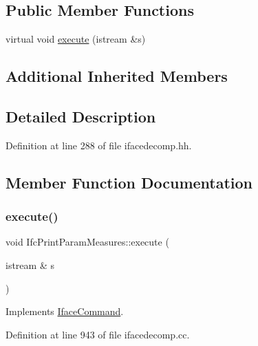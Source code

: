 \subsection*{Public Member Functions}
\begin{DoxyCompactItemize}
\item 
virtual void \mbox{\hyperlink{class_ifc_print_param_measures_a85f768a0cc5ac73b3feb42d46089ebce}{execute}} (istream \&s)
\end{DoxyCompactItemize}
\subsection*{Additional Inherited Members}


\subsection{Detailed Description}


Definition at line 288 of file ifacedecomp.\+hh.



\subsection{Member Function Documentation}
\mbox{\label{class_ifc_print_param_measures_a85f768a0cc5ac73b3feb42d46089ebce}} 
\subsubsection{\texorpdfstring{execute()}{execute()}}
{\footnotesize\ttfamily void Ifc\+Print\+Param\+Measures\+::execute (\begin{DoxyParamCaption}\item[{istream \&}]{s }\end{DoxyParamCaption})\hspace{0.3cm}{\ttfamily [virtual]}}



Implements \mbox{\hyperlink{class_iface_command_af10e29cee2c8e419de6efe9e680ad201}{Iface\+Command}}.



Definition at line 943 of file ifacedecomp.\+cc.


